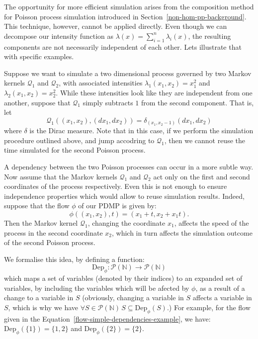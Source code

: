 \documentclass[report.tex]{subfiles}
\begin{document}
The opportunity for more efficient simulation arises
from the composition method for Poisson process simulation introduced in
Section~\ref{non-hom-pp-background}.
This technique, however, cannot be applied directly. Even though we can decompose
our intensity function as $\lambda(x) = \sum_{i=1}^{n} \lambda_{i}(x)$, the
resulting components are not necessarily independent of each other. Lets illustrate
that with specific examples.

Suppose we want to simulate a two dimensional process governed by two
Markov kernels $\mathcal{Q}_{1}$ and $\mathcal{Q}_{2}$, with associated
intensities \mbox{$\lambda_{1}(x_{1}, x_{2}) = x_{1}^{2}$}
and \mbox{$\lambda_{2}(x_{1}, x_{2}) = x_{2}^{2}$}.
While these intensities look like they are independent from one another,
suppose that $\mathcal{Q}_{1}$ simply subtracts $1$ from the second component.
That is, let
$$
\mathcal{Q}_{1}((x_{1}, x_{2}), (dx_{1}, dx_{2})) = \delta_{(x_{1}, x_{2}-1)}(dx_{1}, dx_{2})
$$
where $\delta$ is the Dirac measure.
Note that in this case, if we perform the simulation procedure outlined above,
and jump accodring to $\mathcal{Q}_{1}$, then we cannot reuse the time simulated
for the second Poisson process.

A dependency between the two Poisson processes can occur in a more subtle way.
Now assume that the Markov kernels $\mathcal{Q}_{1}$ and $\mathcal{Q}_{2}$ act
only on the first and second coordinates of the process respectively. Even this
is not enough to ensure independence properties which would allow to reuse simulation
results.
Indeed, suppose that the flow $\phi$ of our PDMP is given by:
\begin{equation}
\label{flow-simple-dependencies-example}
\phi((x_{1}, x_{2}), t) = (x_{1} + t, x_{2} + x_{1}t).
\end{equation}
Then the Markov kernel $\mathcal{Q}_{1}$, changing the coordinate $x_{1}$,
affects the speed of the process in the second coordinate $x_{2}$, which
in turn affects the simulation outcome of the second Poisson process.

We formalise this idea, by defining a function:
\begin{equation}
  \text{Dep}_{\phi} : \mathcal{P}(\mathbb{N}) \to \mathcal{P}(\mathbb{N})
\end{equation}
which maps a set of variables (denoted by their indices) to an expanded
set of variables, by including the variables which will be afected by $\phi$,
as a result of a change to a variable in $S$ (obviously, changing a variable in $S$ affects a variable in $S$,
which is why we have $\forall S \in \mathcal{P}(\mathbb{N})\,S \subseteq \text{Dep}_{\phi}(S)$.)
For example, for the flow given in the Equation~\ref{flow-simple-dependencies-example}, we have:
\mbox{$\text{Dep}_{\phi}(\{1\}) = \{1, 2\}$} and \mbox{$\text{Dep}_{\phi}(\{2\}) = \{2\}$}.
\end{document}
